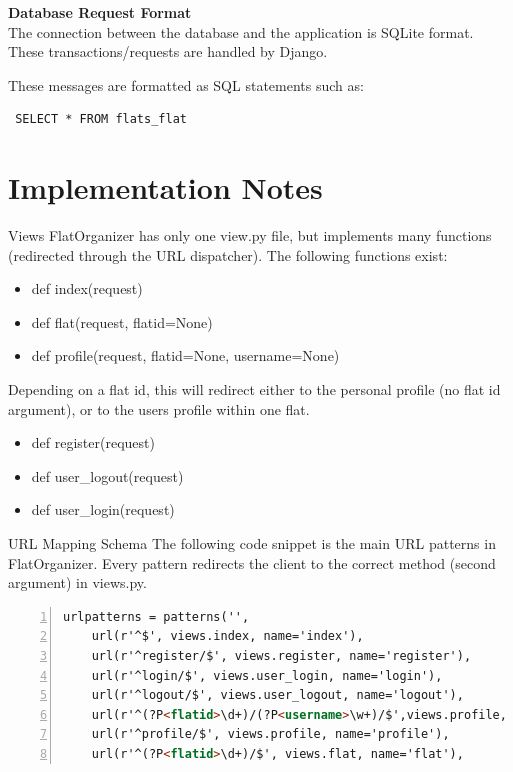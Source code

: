 \documentclass{sig-alt-release2}
\begin{document}
\noindent
\textbf{Database Request Format} \\
The connection between the database and the application is SQLite format. These transactions/requests are handled by Django.

These messages are formatted as SQL statements such as: 
\begin{verbatim} SELECT * FROM flats_flat \end{verbatim}



\section{Implementation Notes}

Views
FlatOrganizer has only one view.py file, but implements many functions (redirected through the URL dispatcher). The following functions exist:

\begin{itemize}
\item def index(request)
\item def flat(request, flatid=None)
\item def profile(request, flatid=None, username=None)
\end{itemize}
Depending on a flat id, this will redirect either to the personal profile (no flat id argument), or to the users profile within one flat.
\begin{itemize}
\item def register(request)
\item def user{\_}logout(request)
\item def user{\_}login(request)
\end{itemize}
URL Mapping Schema
The following code snippet is the main URL patterns in FlatOrganizer. Every pattern redirects the client to the correct method (second argument) in views.py.

\begin{lstlisting}[language=HTML, numbers=left, linewidth=8.5cm, breaklines=true, breakautoindent=true]
urlpatterns = patterns('',
	url(r'^$', views.index, name='index'),
	url(r'^register/$', views.register, name='register'),
	url(r'^login/$', views.user_login, name='login'),
	url(r'^logout/$', views.user_logout, name='logout'),
    url(r'^(?P<flatid>\d+)/(?P<username>\w+)/$',views.profile, name='flatuser'),
	url(r'^profile/$', views.profile, name='profile'),
   	url(r'^(?P<flatid>\d+)/$', views.flat, name='flat'),
\end{lstlisting}
\end{document}
